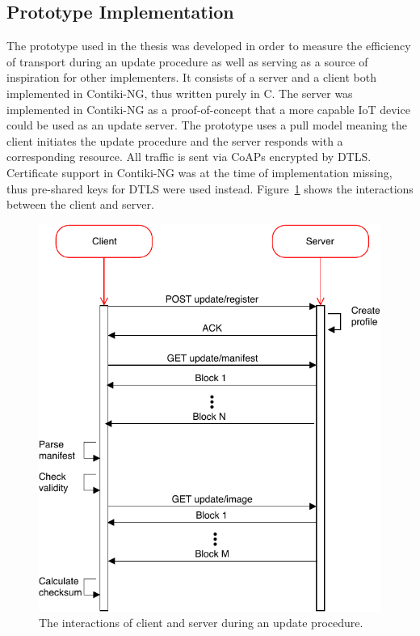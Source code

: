 \documentclass[0-thesis.tex]{subfiles}
\begin{document}
\subsection{Prototype Implementation}
\label{ssec:prototype-implementation}
The prototype used in the thesis was developed in order to measure the efficiency of
transport during an update procedure as well as serving as a source of inspiration for
other implementers. It consists of a server and a client both implemented in Contiki-NG,
thus written purely in C. The server was implemented in Contiki-NG as a proof-of-concept
that a more capable IoT device could be used as an update server. The prototype uses a
pull model meaning the client initiates the update procedure and the server responds with
a corresponding resource. All traffic is sent via CoAPs encrypted by DTLS. Certificate
support in Contiki-NG was at the time of implementation missing, thus pre-shared keys for
DTLS were used instead. Figure~\ref{fig:client-server-interaction} shows the interactions
between the client and server.

\begin{figure}[h!]
    \caption{The interactions of client and server during an update procedure.}
    \label{fig:client-server-interaction}
    \includegraphics{images/client-server-sequence.pdf}
\end{figure}
\end{document}

